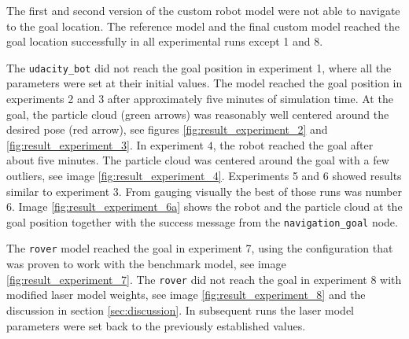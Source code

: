 \documentclass[10pt,journal,compsoc]{IEEEtran}
\begin{document}
The first and second version of the custom robot model were not able to navigate to the goal location. The reference model and the final custom model reached the goal location successfully in all experimental runs except 1 and 8.

The \texttt{udacity\_bot} did not reach the goal position in experiment 1, where all the parameters were set at their initial values. The model reached the goal position in experiments 2 and 3 after approximately five minutes of simulation time. At the goal, the particle cloud (green arrows) was reasonably well centered around the desired pose (red arrow), see figures \ref{fig:result_experiment_2} and \ref{fig:result_experiment_3}. In experiment  $4$, the robot reached the goal after about five minutes. The particle cloud was centered around the goal with a few outliers, see image \ref{fig:result_experiment_4}. Experiments 5 and 6 showed results similar to experiment 3. From gauging visually the best of those runs was number 6. Image \ref{fig:result_experiment_6a} shows the robot and the particle cloud at the goal position together with the success message from the \texttt{navigation\_goal} node.

The \texttt{rover} model reached the goal in experiment 7, using the configuration that was proven to work with the benchmark model, see image \ref{fig:result_experiment_7}. The \texttt{rover} did not reach the goal in experiment 8 with modified laser model weights, see image \ref{fig:result_experiment_8} and the discussion in section \ref{sec:discussion}. In subsequent runs the laser model parameters were set back to the previously established values.
\end{document}
